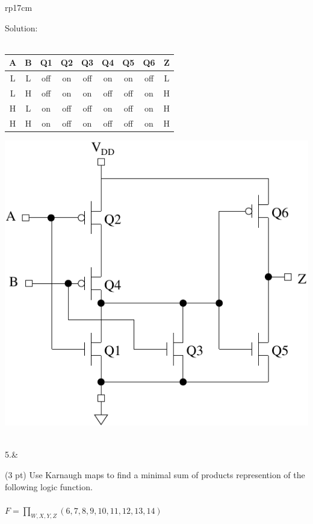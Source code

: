 \documentclass{article}
\begin{document}
\begin{longtable}[l]{rp{17cm}}
\begin{minipage}[t]{\linewidth}
Solution: \\ \\
\begin{tabular}{ccccccccc}
  \textbf{A} & \textbf{B} & \textbf{Q1} & \textbf{Q2} & \textbf{Q3} & \textbf{Q4} & \textbf{Q5} & \textbf{Q6} & \textbf{Z} \\
  \hline
  L & L & off & on & off & on & on & off & L\\
  L & H & off & on & on & off & off & on & H\\
  H & L & on & off & off & on & off & on & H\\
  H & H & on & off & on & off & off & on & H\\
\end{tabular}
\medskip
\includegraphics{../CMOSCircuits/Assessments/CMOSORGate}
\end{minipage}\\
\medskip
5.&\begin{minipage}[t]{\linewidth}(3 pt) Use Karnaugh maps to find a minimal sum of products represention of the following logic function.\\ \\
$F=\prod_{W,X,Y,Z}(6,7,8,9,10,11,12,13,14)$\\


\end{minipage}
\end{longtable}
\end{document}
